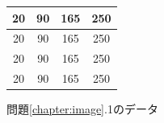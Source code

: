 \begin{figure}[H]
\begin{center}
\begin{tabular}{|c|c|c|c|}
\hline
20 & 90 & 165 & 250 \\
\hline 
20 & 90 & 165 & 250 \\
\hline
20 & 90 & 165 & 250 \\
\hline
20 & 90 & 165 & 250 \\
\hline 
\end{tabular}
\end{center}
\caption{問題\ref{chapter:image}.1のデータ}
\label{fig:ima-d}
\end{figure}





